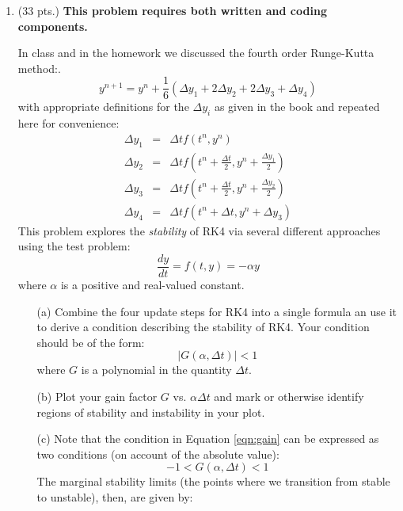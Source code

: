 \documentclass{article}
\begin{document}
\begin{enumerate}

  
  \item (33 pts.) \textbf{This problem requires both written and coding components.}  
  
In class and in the homework we discussed the fourth order Runge-Kutta method:.  
\begin{equation}
  y^{n+1} = y^{n} + \frac{1}{6} \left( \Delta y_1 + 2 \Delta y_2 + 2 \Delta y_3 + \Delta y_4 \right)
\end{equation}
with appropriate definitions for the $\Delta y_i$ as given in the book and repeated here for convenience:
\begin{eqnarray}
  \Delta y_1 &=& \Delta t f(t^n,y^n) \\
  \Delta y_2 &=& \Delta t f \left( t^n+\frac{\Delta t}{2},y^n + \frac{\Delta y_1}{2}\right) \\  
  \Delta y_3 &=& \Delta t f \left( t^n+\frac{\Delta t}{2},y^n + \frac{\Delta y_2}{2}\right) \\  
  \Delta y_4 &=& \Delta t f \left( t^n+\Delta t,y^n + \Delta y_3 \right) 
\end{eqnarray}
This problem explores the \emph{stability} of RK4 via several different approaches using the test problem:
\begin{equation}
  \frac{d y}{d t} = f(t,y) = - \alpha y \label{eqn:testODE}
\end{equation}
where $\alpha$ is a positive and real-valued constant.  
  \begin{enumerate}
     \item[(a)]  Combine the four update steps for RK4 into a single formula an use it to derive a condition describing the stability of RK4.  Your condition should be of the form:
     \begin{equation}
       \left| G(\alpha,\Delta t) \right| < 1 \label{eqn:gain}
     \end{equation}
     where $G$ is a polynomial in the quantity $\Delta t$.  
     \item[(b)]  Plot your gain factor $G$ vs. $\alpha \Delta t$ and mark or otherwise identify regions of stability and instability in your plot.
     \item[(c)]  Note that the condition in Equation \ref{eqn:gain} can be expressed as two conditions (on account of the absolute value):
     \begin{equation}
       -1 < G(\alpha,\Delta t)<1
     \end{equation}
     The marginal stability limits (the points where we transition from stable to unstable), then, are given by:

\end{enumerate}
\end{enumerate}
\end{document}

